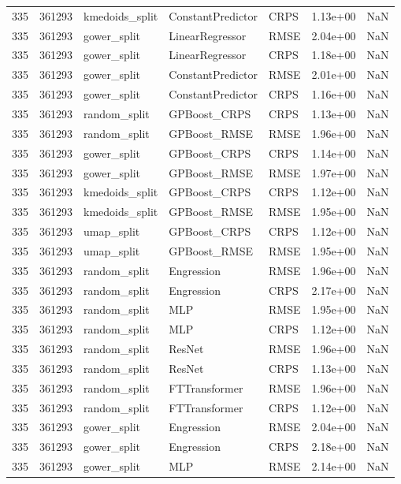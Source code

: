 \begin{tabular}{rrlllrr}
335 & 361293 & kmedoids\_split & ConstantPredictor & CRPS & 1.13e+00 & NaN \\
335 & 361293 & gower\_split & LinearRegressor & RMSE & 2.04e+00 & NaN \\
335 & 361293 & gower\_split & LinearRegressor & CRPS & 1.18e+00 & NaN \\
335 & 361293 & gower\_split & ConstantPredictor & RMSE & 2.01e+00 & NaN \\
335 & 361293 & gower\_split & ConstantPredictor & CRPS & 1.16e+00 & NaN \\
335 & 361293 & random\_split & GPBoost\_CRPS & CRPS & 1.13e+00 & NaN \\
335 & 361293 & random\_split & GPBoost\_RMSE & RMSE & 1.96e+00 & NaN \\
335 & 361293 & gower\_split & GPBoost\_CRPS & CRPS & 1.14e+00 & NaN \\
335 & 361293 & gower\_split & GPBoost\_RMSE & RMSE & 1.97e+00 & NaN \\
335 & 361293 & kmedoids\_split & GPBoost\_CRPS & CRPS & 1.12e+00 & NaN \\
335 & 361293 & kmedoids\_split & GPBoost\_RMSE & RMSE & 1.95e+00 & NaN \\
335 & 361293 & umap\_split & GPBoost\_CRPS & CRPS & 1.12e+00 & NaN \\
335 & 361293 & umap\_split & GPBoost\_RMSE & RMSE & 1.95e+00 & NaN \\
335 & 361293 & random\_split & Engression & RMSE & 1.96e+00 & NaN \\
335 & 361293 & random\_split & Engression & CRPS & 2.17e+00 & NaN \\
335 & 361293 & random\_split & MLP & RMSE & 1.95e+00 & NaN \\
335 & 361293 & random\_split & MLP & CRPS & 1.12e+00 & NaN \\
335 & 361293 & random\_split & ResNet & RMSE & 1.96e+00 & NaN \\
335 & 361293 & random\_split & ResNet & CRPS & 1.13e+00 & NaN \\
335 & 361293 & random\_split & FTTransformer & RMSE & 1.96e+00 & NaN \\
335 & 361293 & random\_split & FTTransformer & CRPS & 1.12e+00 & NaN \\
335 & 361293 & gower\_split & Engression & RMSE & 2.04e+00 & NaN \\
335 & 361293 & gower\_split & Engression & CRPS & 2.18e+00 & NaN \\
335 & 361293 & gower\_split & MLP & RMSE & 2.14e+00 & NaN \\

\end{tabular}

